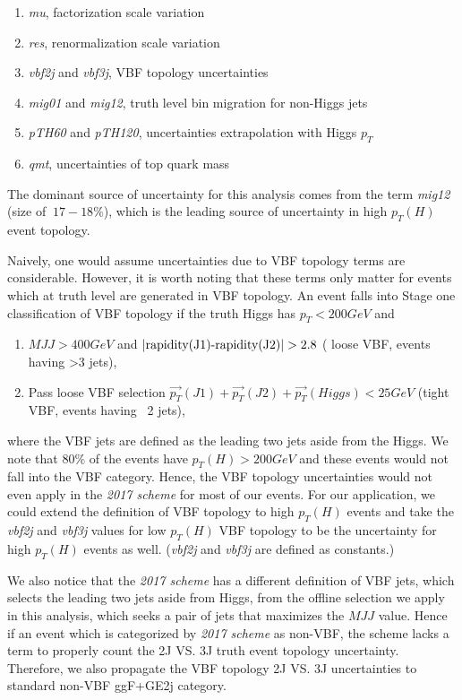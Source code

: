 \begin{enumerate}
\item \textit{mu}, factorization scale variation
\item \textit{res}, renormalization scale variation
\item \textit{vbf2j} and \textit{vbf3j}, VBF topology uncertainties
\item \textit{mig01} and \textit{mig12}, truth level bin migration for non-Higgs jets
\item \textit{pTH60} and \textit{pTH120}, uncertainties extrapolation with Higgs $p_T$
\item \textit{qmt}, uncertainties of top quark mass
\end{enumerate}

The dominant source of uncertainty for this analysis comes from the term \textit{mig12} (size of $~17-18\%$), 
which is the leading source of uncertainty in high $p_T(H)$ event topology. 

Naively, one would assume uncertainties due to VBF topology terms are considerable. 
However, it is worth noting that these terms only matter for events which 
at truth level are generated in VBF topology. An event falls into Stage one classification 
of VBF topology if the truth Higgs has $p_T<200GeV$ and 
\begin{enumerate}
\item $MJJ>400 GeV$ and $|\textnormal{rapidity(J1)-rapidity(J2)}|>2.8$ ( loose VBF, events having >3 jets),
\item Pass loose VBF selection $\overrightarrow{p_{T}}(J1)+\overrightarrow{p_{T}}(J2)+\overrightarrow{p_{T}}(Higgs)<25GeV$ (tight VBF, events having ~2 jets),
\end{enumerate}
where the VBF jets are defined as the leading two jets aside from the Higgs. We note that $80\%$ of the events have $p_T(H)>200GeV$ and 
these events would not fall into the VBF category. Hence, the VBF topology uncertainties would not even apply in the \textit{2017 scheme} for most of our events. 
For our application, we could extend the definition of VBF topology to high $p_T(H)$ events and take the \textit{vbf2j} and \textit{vbf3j} values
for low $p_T(H)$ VBF topology to be the uncertainty for high $p_T(H)$ events as well. (\textit{vbf2j} and \textit{vbf3j} are defined as constants.)

We also notice that the \textit{2017 scheme} has a different definition of VBF jets, which selects the leading two jets aside from Higgs,  from the 
offline selection we apply in this analysis, which seeks a pair of jets that maximizes the $MJJ$ value. Hence if an event which is categorized by \textit{2017 scheme}
as non-VBF, the scheme lacks a term to properly count the 2J VS. 3J truth event topology uncertainty. Therefore, we also propagate the VBF topology 2J VS. 3J
uncertainties to standard non-VBF ggF+GE2j category. 

